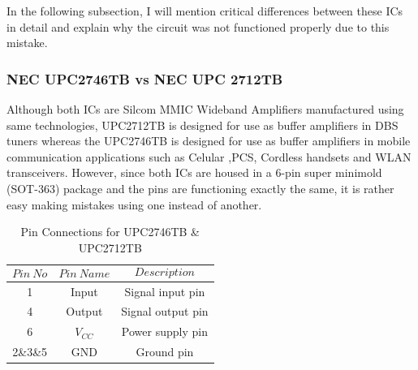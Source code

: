 \newpage

	In the following subsection, I will mention critical differences between these ICs in detail and explain why the circuit was not functioned properly due to this mistake.



\subsubsection*{NEC UPC2746TB vs NEC UPC 2712TB}
\- \indent
	Although both ICs are Silcom MMIC Wideband Amplifiers manufactured using same technologies, UPC2712TB is designed for use as buffer amplifiers in DBS tuners\cite{2712} whereas the UPC2746TB is designed for use as buffer amplifiers in mobile communication applications such as Celular ,PCS, Cordless handsets and WLAN transceivers\cite{2746}. However, since both ICs are housed in a 6-pin super minimold (SOT-363) package and the pins are functioning exactly the same, it is rather easy making mistakes using one instead of another.
	
	
% 
%      

\begin{table}[H]
  \centering
 	\caption{Pin Connections for UPC2746TB \& UPC2712TB}
    \begin{tabular}{c|c|c}
       $$Pin~No$$ & $$Pin~Name$$ & $$Description$$ \\ \hline
       1 & Input  & Signal input pin  \\ \hline
       4 & Output & Signal output pin  \\ \hline
       6 & $V_{CC}$ & Power supply pin  \\ \hline
       2\&3\&5 & GND & Ground pin
 	\end{tabular}
  
  \label{tab:pins}
\end{table}


